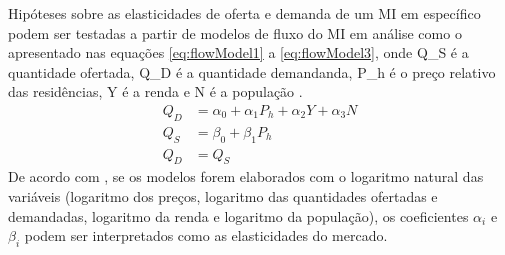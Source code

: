 \documentclass[
	12pt,				%
	oneside,			%
	a4paper,			%
	chapter=TITLE,		%
	section=TITLE,		%
	english,			%
	brazil				%
	]{abntex2}
\begin{document}
\begin{refsection}
Hipóteses sobre as elasticidades de oferta e demanda de um \gls{MI} em específico
podem ser testadas a partir de modelos de fluxo do \gls{MI} em análise como o
apresentado nas equações \eqref{eq:flowModel1} a \eqref{eq:flowModel3}, onde
\gls{Q_S} é a quantidade ofertada, \gls{Q_D} é a quantidade demandanda,
\gls{P_h} é o preço relativo das residências, \gls{Y} é a renda e \gls{N} é a
população \autocite[ p.~282]{longrunsupplyelasticity}.
\begin{align} 
Q_D &= \alpha_0 + \alpha_1 P_h + \alpha_2 Y + \alpha_3 N \label{eq:flowModel1}\\ 
Q_S &= \beta_0 + \beta_1 P_h \label{eq:flowModel2}\\
Q_D &= Q_S \label{eq:flowModel3}
\end{align}
De acordo com \textcite[p.~282]{longrunsupplyelasticity}, se os modelos forem elaborados
com o logaritmo natural das variáveis (logaritmo dos preços, logaritmo das
quantidades ofertadas e demandadas, logaritmo da renda e logaritmo da
população), os coeficientes \(\alpha_i\) e \(\beta_i\) podem ser interpretados
como as elasticidades do mercado.


\end{refsection}
\end{document}

